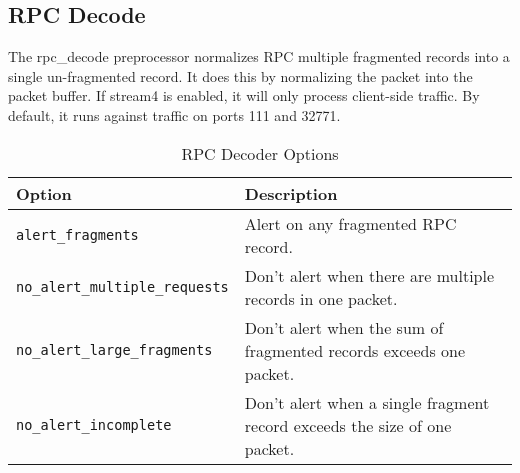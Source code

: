\documentclass[english]{report}
\newenvironment{note}{
\samepage
    \vspace{10pt}{\textsf{
        {\hspace{7pt}\Huge{$\triangle$\hspace{-12.5pt}{\Large{$^!$}}}}\hspace{5pt}
        {\Large{NOTE}}
    }
    }
   \begin{center}
    \par\vspace{-17pt}

    \begin{lrbox}{\savepar}
    \begin{minipage}[r]{6in}
}
{
    \end{minipage}
    \end{lrbox}
    \fbox{
        \usebox{
            \savepar
	}
    }
    \par\vskip10pt
    \end{center}
}
\begin{document}
%
%
%
%
%

\subsection{RPC Decode\label{sub:rpc-decoder}}

The rpc\_decode preprocessor normalizes RPC multiple fragmented
records into a single un-fragmented record.  It does this by
normalizing the packet into the packet buffer.  If stream4 is
enabled, it will only process client-side traffic.  By default, it runs against
traffic on ports 111 and 32771.

\begin{table}[!hbpt]

\caption{RPC Decoder Options\label{rpc options}}

\begin{center}\begin{tabular}{| l | l |}
\hline 
\textbf{Option}&
\textbf{Description}\\
\hline
\hline 
\texttt{alert\_fragments}&
Alert on any fragmented RPC record.\\
\hline 
\texttt{no\_alert\_multiple\_requests}&
Don't alert when there are multiple records in one packet.\\
\hline 
\texttt{no\_alert\_large\_fragments}&
Don't alert when the sum of fragmented records exceeds one packet.\\
\hline 
\texttt{no\_alert\_incomplete}&
Don't alert when a single fragment record exceeds the size of one
packet.\\
\hline
\end{tabular}\end{center}
\end{table}
\end{document}
